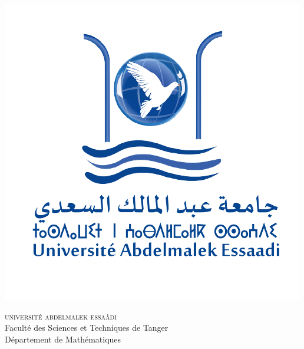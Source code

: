 \begin{titlepage}

\begin{minipage}{.15\textwidth}
    \begin{flushleft}
        \includegraphics[width=\textwidth]{IMAGES/logo_uae.png}
    \end{flushleft}
\end{minipage}%
\begin{minipage}{.7\textwidth}
    \begin{center}
        {\scshape \Large
        université abdelmalek essaâdi\\
        }
        {\large
        Faculté des Sciences et Techniques de Tanger\\
        }
        {\large Département de Mathématiques \\
        }
    \end{center}
\end{minipage}%
\begin{minipage}{.15\textwidth}
    \begin{flushright}

\end{flushright}
\end{minipage}
\end{titlepage}

